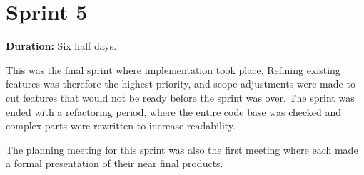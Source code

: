 \section*{Sprint 5}%

\textbf{Duration:} Six half days. \newline

This was the final sprint where implementation took place. 
Refining existing features was therefore the highest priority, and scope adjustments were made to cut features that would not be ready before the sprint was over. 
The sprint was ended with a refactoring period, where the entire code base was checked and complex parts were rewritten to increase readability. 

The planning meeting for this sprint was also the first meeting where each \localgroup{} made a formal presentation of their near final products.